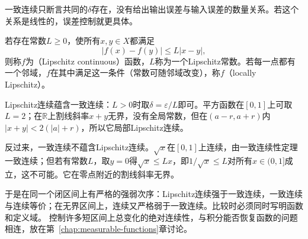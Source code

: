 一致连续只断言共同的$\delta$存在，没有给出输出误差与输入误差的数量关系。若这个关系是线性的，误差控制就更具体。
\begin{definition}[Lipschitz连续]
\label{def:analysis-lipschitz-continuity}
若存在常数$L\geq0$，使所有$x,y\in X$都满足
\begin{equation}
 |f(x)-f(y)|\leq L|x-y|,
 \label{eq:analysis-lipschitz-condition}
\end{equation}
则称$f$为（Lipschitz continuous）函数，$L$称为一个Lipschitz常数。若每一点都有一个邻域，$f$在其中满足这一条件（常数可随邻域改变），称$f$（locally Lipschitz）。
\end{definition}
Lipschitz连续蕴含一致连续：$L>0$时取$\delta=\varepsilon/L$即可。平方函数在$[0,1]$上可取$L=2$；在$\mathbb R$上割线斜率$x+y$无界，没有全局常数，但在$(a-r,a+r)$内$|x+y|<2(|a|+r)$，所以它局部Lipschitz连续。

反过来，一致连续不蕴含Lipschitz连续。$\sqrt x$在$[0,1]$上连续，由一致连续性定理一致连续；但若有常数$L$，取$y=0$得$\sqrt x\leq Lx$，即$1/\sqrt x\leq L$对所有$x\in(0,1]$成立，这不可能。它在零点附近的割线斜率无界。

于是在同一个闭区间上有严格的强弱次序：Lipschitz连续强于一致连续，一致连续与连续等价；在无界区间上，连续又严格弱于一致连续。比较时必须同时写明函数和定义域。
控制许多短区间上总变化的绝对连续性，与积分能否恢复函数的问题相连，放在第~\ref{chap:measurable-functions}章讨论。
